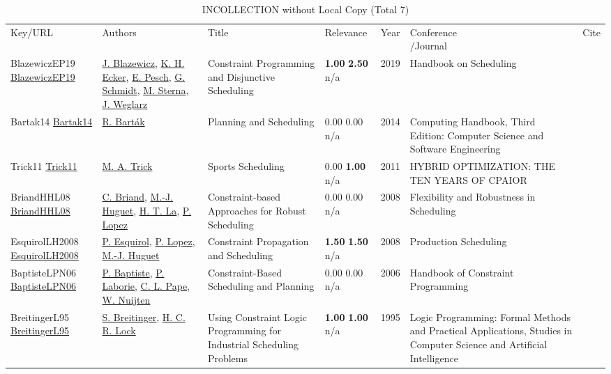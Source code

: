 {\scriptsize
\begin{longtable}{p{3cm}p{5cm}p{10cm}p{1cm}rp{2.5cm}l}
\rowcolor{white}\caption{INCOLLECTION without Local Copy (Total 7)}\\ \toprule
\rowcolor{white}Key/URL & Authors & Title & Relevance &Year & \shortstack{Conference\\/Journal} & Cite\\ \midrule
\endhead
\bottomrule
\endfoot
BlazewiczEP19 \href{https://ideas.repec.org/h/spr/ihichp/978-3-319-99849-7_16.html}{BlazewiczEP19} & \hyperref[auth:a764]{J. Blazewicz}, \hyperref[auth:a765]{K. H. Ecker}, \hyperref[auth:a437]{E. Pesch}, \hyperref[auth:a766]{G. Schmidt}, \hyperref[auth:a767]{M. Sterna}, \hyperref[auth:a768]{J. Weglarz} & {Constraint Programming and Disjunctive Scheduling} & \noindent{}\textbf{1.00} \textbf{2.50} n/a & 2019 & {Handbook on Scheduling} & \cite{BlazewiczEP19}\\
Bartak14 \href{}{Bartak14} & \hyperref[auth:a152]{R. Bart{\'{a}}k} & Planning and Scheduling & \noindent{}\textcolor{black!50}{0.00} \textcolor{black!50}{0.00} n/a & 2014 & Computing Handbook, Third Edition: Computer Science and Software Engineering & \cite{Bartak14}\\
Trick11 \href{http://dx.doi.org/10.1007/978-1-4419-1644-0_15}{Trick11} & \hyperref[auth:a1388]{M. A. Trick} & Sports Scheduling & \noindent{}\textcolor{black!50}{0.00} \textbf{1.00} n/a & 2011 & HYBRID OPTIMIZATION: THE TEN YEARS OF CPAIOR & \cite{Trick11}\\
BriandHHL08 \href{http://dx.doi.org/10.1002/9780470611432.ch9}{BriandHHL08} & \hyperref[auth:a1197]{C. Briand}, \hyperref[auth:a1198]{M.-J. Huguet}, \hyperref[auth:a1199]{H. T. La}, \hyperref[auth:a3]{P. Lopez} & Constraint-based Approaches for Robust Scheduling & \noindent{}\textcolor{black!50}{0.00} \textcolor{black!50}{0.00} n/a & 2008 & Flexibility and Robustness in Scheduling & \cite{BriandHHL08}\\
EsquirolLH2008 \href{http://dx.doi.org/10.1002/9780470611050.ch5}{EsquirolLH2008} & \hyperref[auth:a1247]{P. Esquirol}, \hyperref[auth:a3]{P. Lopez}, \hyperref[auth:a1198]{M.-J. Huguet} & Constraint Propagation and Scheduling & \noindent{}\textbf{1.50} \textbf{1.50} n/a & 2008 & Production Scheduling & \cite{EsquirolLH2008}\\
BaptisteLPN06 \href{https://doi.org/10.1016/S1574-6526(06)80026-X}{BaptisteLPN06} & \hyperref[auth:a162]{P. Baptiste}, \hyperref[auth:a118]{P. Laborie}, \hyperref[auth:a163]{C. L. Pape}, \hyperref[auth:a655]{W. Nuijten} & Constraint-Based Scheduling and Planning & \noindent{}\textcolor{black!50}{0.00} \textcolor{black!50}{0.00} n/a & 2006 & Handbook of Constraint Programming & \cite{BaptisteLPN06}\\
BreitingerL95 \href{}{BreitingerL95} & \hyperref[auth:a694]{S. Breitinger}, \hyperref[auth:a695]{H. C. R. Lock} & Using Constraint Logic Programming for Industrial Scheduling Problems & \noindent{}\textbf{1.00} \textbf{1.00} n/a & 1995 & Logic Programming: Formal Methods and Practical Applications, Studies in Computer Science and Artificial Intelligence & \cite{BreitingerL95}\\
\end{longtable}
}

